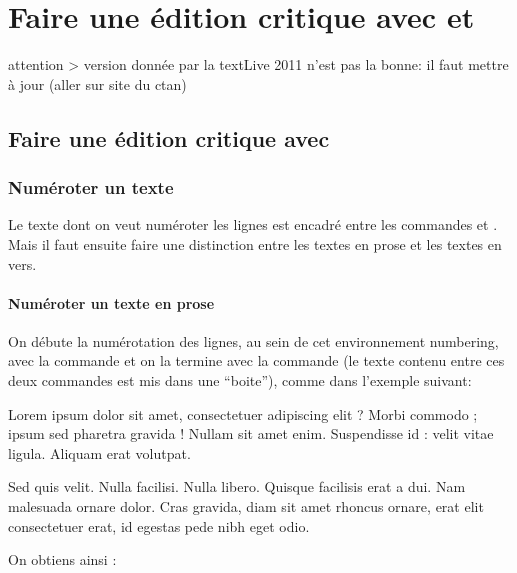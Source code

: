 

\chapter{Faire une édition critique avec  et }



attention > version donnée par la textLive 2011 n'est pas la bonne: il faut mettre à jour  (aller sur site du ctan)

\section{Faire une édition critique avec }

\subsection{Numéroter un texte}

Le texte dont on veut numéroter les lignes est encadré entre les commandes  et . Mais il faut ensuite faire une distinction entre les textes en prose et les textes en vers. 

\subsubsection{Numéroter un texte en prose}


On débute la numérotation des lignes, au sein de cet environnement numbering, avec la commande  et on la termine avec la commande  (le texte contenu entre ces deux commandes est mis dans une \enquote{boite}), comme dans l'exemple suivant:

\begin{latexcode*}
\beginnumbering
\pstart %
Lorem ipsum dolor sit amet, consectetuer adipiscing elit ?
Morbi commodo ; ipsum sed pharetra gravida !
Nullam sit amet enim. Suspendisse id : velit vitae ligula.
Aliquam erat volutpat.

Sed quis velit. Nulla facilisi. Nulla libero. 
Quisque facilisis erat a dui. 
Nam malesuada ornare dolor.
Cras gravida, diam sit amet rhoncus ornare, 
erat  elit consectetuer erat, id egestas pede nibh eget odio.
\pend %
\endnumbering
\end{latexcode*}

On obtiens ainsi : \bigbreak

